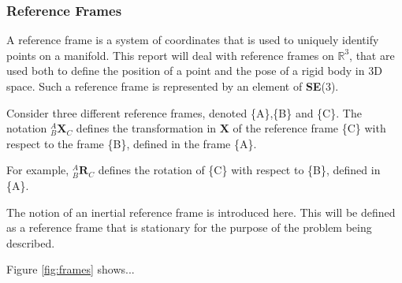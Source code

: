 		\begin{comment}		
		\textbf{Adjoint Map}\\
		EXPLANATION\\
		The adjoint map of $\mathbf{SE}(3)$ is
		\begin{equation}
			\Psi_S: \mathbf{SE}(3) \rightarrow \mathbf{SE}(3) \textnormal{, }
			\Psi_S(A) \stackrel{\Delta}{=} SAS^{-1}
		\end{equation}
		Taking the derivative:
		\begin{equation}
			\frac{\partial}{\partial t} \Psi_S(A(t))|_{t=0} = SBS^{-1} \textnormal{, }
			B \stackrel{\Delta}{=} 	\frac{\partial}{\partial t}A(t)|_{t=0}
		\end{equation}
		The adjoint	representation of $\mathbf{SE}(3)$ is given by the mapping
		\begin{equation}
			\textbf{Adj}_S: \mathfrak{se}(3) \rightarrow \mathfrak{se}(3) \textnormal{, }
			\textbf{Adj}_S(B) \stackrel{\Delta}{=} SBS^{-1}
		\end{equation}
		\end{comment}
		
	\subsubsection{Reference Frames}
		A reference frame is a system of coordinates that is used to uniquely identify points on a manifold. This report will deal with reference frames on $\mathbb{R}^3$, that are used both to define the position of a point and the pose of a rigid body in 3D space.
		Such a reference frame is represented by an element of \textbf{SE}(3).
		
		Consider three different reference frames, denoted \{A\},\{B\} and \{C\}.
		The notation $^{A}_{B}\mathbf{X}^{}_{C}$ defines the transformation in $\mathbf{X}$ of the reference frame \{C\} with respect to the frame \{B\}, defined in the frame \{A\}.
		
		For example, $^{A}_{B}\mathbf{R}^{}_{C}$ defines the rotation of \{C\} with respect to \{B\}, defined in \{A\}.
		
		The notion of an inertial reference frame is introduced here. This will be defined as a reference frame that is stationary for the purpose of the problem being described. 
		
		Figure \ref{fig:frames} shows...
		
		

